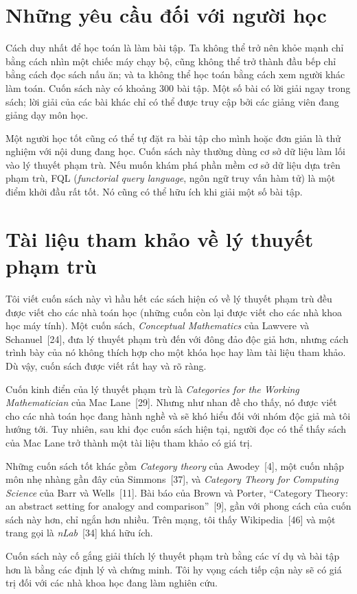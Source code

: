 \section{Những yêu cầu đối với người học}

Cách duy nhất để học toán là làm bài tập. Ta không thể trở nên khỏe mạnh chỉ bằng cách nhìn một chiếc máy chạy bộ, cũng không thể trở thành đầu bếp chỉ bằng cách đọc sách nấu ăn; và ta không thể học toán bằng cách xem người khác làm toán. Cuốn sách này có khoảng 300 bài tập. Một số bài có lời giải ngay trong sách; lời giải của các bài khác chỉ có thể được truy cập bởi các giảng viên đang giảng dạy môn học.

Một người học tốt cũng có thể tự đặt ra bài tập cho mình hoặc đơn giản là thử nghiệm với nội dung đang học. Cuốn sách này thường dùng cơ sở dữ liệu làm lối vào lý thuyết phạm trù. Nếu muốn khám phá phần mềm cơ sở dữ liệu dựa trên phạm trù, FQL (\emph{functorial query language}, ngôn ngữ truy vấn hàm tử) là một điểm khởi đầu rất tốt. Nó cũng có thể hữu ích khi giải một số bài tập.

\section{Tài liệu tham khảo về lý thuyết phạm trù}

Tôi viết cuốn sách này vì hầu hết các sách hiện có về lý thuyết phạm trù đều được viết cho các nhà toán học (những cuốn còn lại được viết cho các nhà khoa học máy tính). Một cuốn sách, \emph{Conceptual Mathematics} của Lawvere và Schanuel~[24], đưa lý thuyết phạm trù đến với đông đảo độc giả hơn,
nhưng cách trình bày của nó không thích hợp cho một khóa học hay làm tài liệu tham khảo. Dù vậy, cuốn sách được viết rất hay và rõ ràng.

Cuốn kinh điển của lý thuyết phạm trù là \emph{Categories for the Working Mathematician} của Mac Lane~[29]. Nhưng như nhan đề cho thấy, nó được viết cho các nhà toán học đang hành nghề và sẽ khó hiểu đối với nhóm độc giả mà tôi hướng tới. Tuy nhiên, sau khi đọc cuốn sách hiện tại, người đọc có thể thấy sách của Mac Lane trở thành một tài liệu tham khảo có giá trị.

Những cuốn sách tốt khác gồm \emph{Category theory} của Awodey~[4], một cuốn nhập môn nhẹ nhàng gần đây của Simmons~[37], và \emph{Category Theory for Computing Science} của Barr và Wells~[11]. Bài báo của Brown và Porter, ``Category Theory: an abstract setting for analogy and comparison''~[9], gần với phong cách của cuốn sách này hơn, chỉ ngắn hơn nhiều. Trên mạng, tôi thấy Wikipedia~[46] và một trang gọi là \emph{nLab}~[34] khá hữu ích.

Cuốn sách này cố gắng giải thích lý thuyết phạm trù bằng các ví dụ và bài tập hơn là bằng các định lý và chứng minh. Tôi hy vọng cách tiếp cận này sẽ có giá trị đối với các nhà khoa học đang làm nghiên cứu.
